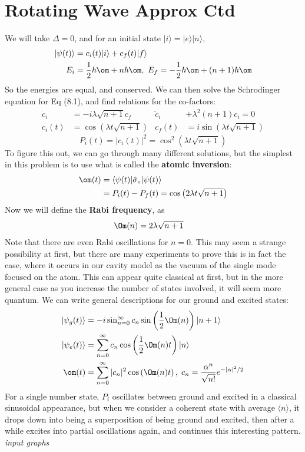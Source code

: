 \documentclass[a4paper, 11pt, normalem]{report}
\newcommand\hsig{\hat{\sigma}}
\begin{document}
\section{Rotating Wave Approx Ctd}
We will take $\Delta=0$, and for an initial state $|i\rangle = |e\rangle|n\rangle$,
\begin{align}
    |\psi(t)\rangle &= c_i(t)|i\rangle + c_f(t)|f\rangle \\
    E_i &= \frac12\hbar\om + n\hbar\om,~ E_f = -\frac12\hbar\om + (n+1)\hbar\om
\end{align}
So the energies are equal, and conserved.
We can then solve the Schrodinger equation for Eq (8.1), and find relations for the co-factors:
\begin{align}
    \dot{c}_i &= -i\lambda\sqrt{n+1}c_f & \ddot{c}_i &+ \lambda^2(n+1)c_i = 0 \\
    c_i(t) &= \cos\left(\lambda t\sqrt{n+1}\right) & c_f(t) &= i\sin\left(\lambda t\sqrt{n+1}\right) 
\end{align}
\begin{equation}
    P_i(t) = |c_i(t)|^2 = \cos^2\left(\lambda t\sqrt{n+1}\right)
\end{equation}
To figure this out, we can go through many different solutions, but the simplest in this problem is to use what is called the \textbf{atomic inversion}:
\begin{align}
    \om(t) &= \langle\psi(t)|\hsig_z|\psi(t)\rangle \\
           &= P_i(t) - P_f(t) = \cos\left(2\lambda t\sqrt{n+1}\right)
\end{align}
Now we will define the \textbf{Rabi frequency}, as
\begin{align}
    \Om(n) &= 2\lambda\sqrt{n+1}
\end{align}
Note that there are even Rabi oscillations for $n=0$.
This may seem a strange possibility at first, but there are many experiments to prove this is in fact the case, where it occurs in our cavity model as the vacuum of the single mode focused on the atom. 
This can appear quite classical at first, but in the more general case as you increase the number of states involved, it will seem more quantum.
We can write general descriptions for our ground and excited states:
\begin{align}
    |\psi_g(t)\rangle &= -i\sin_{n=0}^\infty c_n\sin\left(\frac12\Om(n)\right)|n+1\rangle \\
    |\psi_e(t)\rangle &= \sum_{n=0}^\infty c_n\cos\left(\frac12\Om(n)t\right)|n\rangle \\
    \om(t) &= \sum_{n=0}^\infty |c_n|^2\cos\left(\Om(n)t\right),\; c_n = \frac{\alpha^n}{\sqrt{n!}}e^{-|\alpha|^2/2}
\end{align}
For a single number state, $P_i$ oscillates between ground and excited in a classical sinusoidal appearance, but when we consider a coherent state with average $\langle n\rangle$, it drops down into being a superposition of being ground and excited, then after a while excites into partial oscillations again, and continues this interesting pattern.
\textit{input graphs}
\end{document}
